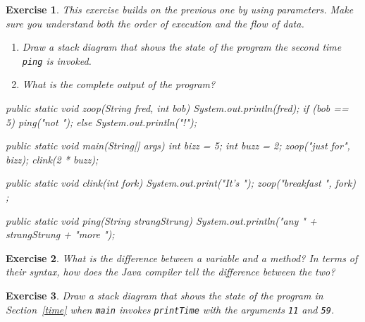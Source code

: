 \documentclass[12pt]{book}
\theoremstyle{exercise}
\newtheorem{exercise}{Exercise}[chapter]
\newcommand{\java}[1]{\verb"#1"}
\newcommand{\java}[1]{\lstinline{#1}} %
\begin{document}
\begin{exercise}
This exercise builds on the previous one by using parameters.
Make sure you understand both the order of execution and the flow of data.

\begin{enumerate}

\item Draw a stack diagram that shows the state of the program the {\it second} time \java{ping} is invoked.

\item What is the complete output of the program?

\end{enumerate}

\begin{code}
    public static void zoop(String fred, int bob) {
        System.out.println(fred);
        if (bob == 5) {
            ping("not ");
        } else {
            System.out.println("!");
        }
    }

    public static void main(String[] args) {
        int bizz = 5;
        int buzz = 2;
        zoop("just for", bizz);
        clink(2 * buzz);
    }

    public static void clink(int fork) {
        System.out.print("It's ");
        zoop("breakfast ", fork) ;
    }

    public static void ping(String strangStrung) {
        System.out.println("any " + strangStrung + "more ");
    }
\end{code}
\end{exercise}


\begin{exercise}

What is the difference between a variable and a method?
In terms of their syntax, how does the Java compiler tell the difference between the two?


\end{exercise}


\begin{exercise}

Draw a stack diagram that shows the state of the program in Section~\ref{time} when \java{main} invokes \java{printTime} with the arguments \java{11} and \java{59}.

\end{exercise}
\end{document}
